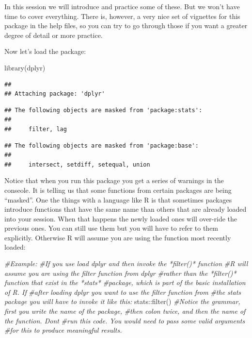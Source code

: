 \documentclass[
]{book}
\newenvironment{Shaded}{\begin{snugshade}}{\end{snugshade}}
\newcommand{\CommentTok}[1]{\textcolor[rgb]{0.56,0.35,0.01}{\textit{#1}}}
\newcommand{\FunctionTok}[1]{\textcolor[rgb]{0.00,0.00,0.00}{#1}}
\newcommand{\NormalTok}[1]{#1}
\newcommand{\SpecialCharTok}[1]{\textcolor[rgb]{0.00,0.00,0.00}{#1}}
\begin{document}
In this session we will introduce and practice some of these. But we won't have time to cover everything. There is, however, a very nice set of vignettes for this package in the help files, so you can try to go through those if you want a greater degree of detail or more practice.

Now let's load the package:

\begin{Shaded}
\begin{Highlighting}[]
\FunctionTok{library}\NormalTok{(dplyr)}
\end{Highlighting}
\end{Shaded}

\begin{verbatim}
## 
## Attaching package: 'dplyr'
\end{verbatim}

\begin{verbatim}
## The following objects are masked from 'package:stats':
## 
##     filter, lag
\end{verbatim}

\begin{verbatim}
## The following objects are masked from 'package:base':
## 
##     intersect, setdiff, setequal, union
\end{verbatim}

Notice that when you run this package you get a series of warnings in the conseole. It is telling us that some functions from certain packages are being ``masked''. One the things with a language like R is that sometimes packages introduce functions that have the same name than others that are already loaded into your session. When that happens the newly loaded ones will over-ride the previous ones. You can still use them but you will have to refer to them explicitly. Otherwise R will assume you are using the function most recently loaded:

\begin{Shaded}
\begin{Highlighting}[]
\CommentTok{\#Example:}
\CommentTok{\#If you use load dplyr and then invoke the *filter()* function}
\CommentTok{\#R will assume you are using the filter function from dplyr}
\CommentTok{\#rather than the *filter()* function that exist in the *stats*}
\CommentTok{\#package, which is part of the basic installation of R. If }
\CommentTok{\#after loading dplyr you want to use the filter function from}
\CommentTok{\#the stats package you will have to invoke it like this:}
\NormalTok{stats}\SpecialCharTok{::}\FunctionTok{filter}\NormalTok{()}
\CommentTok{\#Notice the grammar, first you write the name of the package,}
\CommentTok{\#then colon twice, and then the name of the function. Don\textquotesingle{}t }
\CommentTok{\#run this code. You would need to pass some valid arguments}
\CommentTok{\#for this to produce meaningful results.}
\end{Highlighting}
\end{Shaded}
\end{document}
